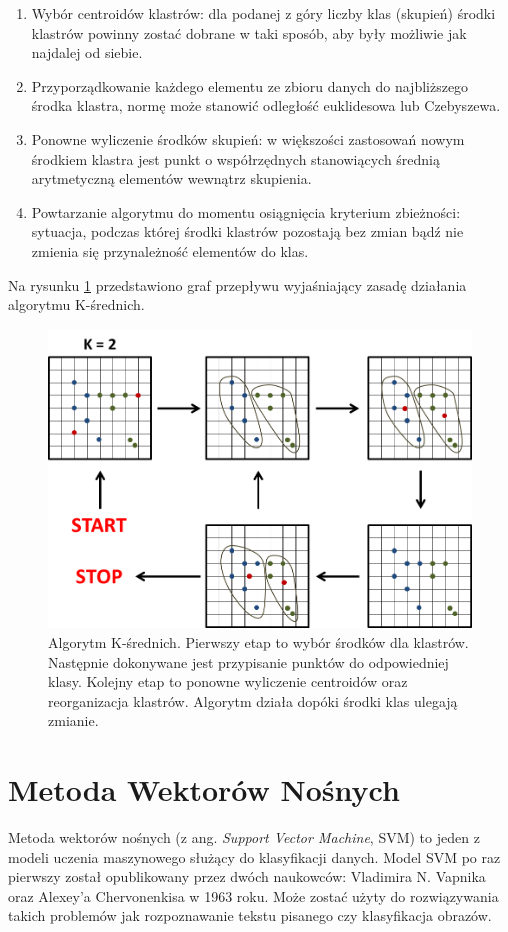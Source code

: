 \begin{enumerate}
	\item Wybór centroidów klastrów: dla podanej z góry liczby klas (skupień) środki klastrów powinny zostać dobrane w taki sposób, aby były możliwie jak najdalej od siebie.
	\item Przyporządkowanie każdego elementu ze zbioru danych do najbliższego środka klastra, normę może stanowić odległość euklidesowa lub Czebyszewa.
	\item Ponowne wyliczenie środków skupień: w większości zastosowań nowym środkiem klastra jest punkt o współrzędnych stanowiących średnią arytmetyczną elementów wewnątrz skupienia.
	\item Powtarzanie algorytmu do momentu osiągnięcia kryterium zbieżności: sytuacja, podczas której środki klastrów pozostają bez zmian bądź nie zmienia się przynależność elementów do klas.
\end{enumerate}

Na rysunku \ref{im: Clustering} przedstawiono graf przepływu wyjaśniający zasadę działania algorytmu K-średnich.
\begin{figure}[h]
	\includegraphics[width=16cm]{Clustering1}
	\centering
	\caption{Algorytm K-średnich. Pierwszy etap to wybór środków dla klastrów. Następnie dokonywane jest przypisanie punktów do odpowiedniej klasy. Kolejny etap to ponowne wyliczenie centroidów oraz reorganizacja klastrów. Algorytm działa dopóki środki klas ulegają zmianie.}
	\label{im: Clustering}
\end{figure}

\section{Metoda Wektorów Nośnych}
\label{sec: SVM}
Metoda wektorów nośnych (z ang. \textit{Support Vector Machine}, SVM) to jeden z modeli uczenia maszynowego służący do klasyfikacji danych. Model SVM po raz pierwszy został opublikowany przez dwóch naukowców: Vladimira N. Vapnika oraz Alexey'a Chervonenkisa w 1963 roku. Może zostać użyty do rozwiązywania takich problemów jak rozpoznawanie tekstu pisanego czy klasyfikacja obrazów.

